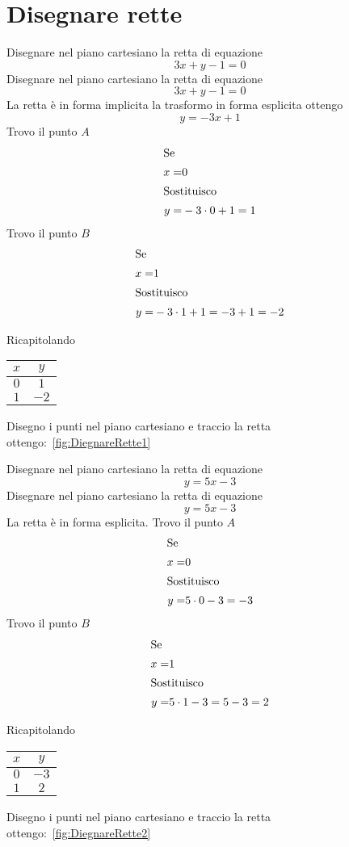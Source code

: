 \section{Disegnare rette}
\begin{exercise}
	Disegnare nel piano cartesiano la retta di equazione \[3x+y-1=0\]
	\tcblower
	Disegnare nel piano cartesiano la retta di equazione \[3x+y-1=0\]
	La retta è in forma implicita la trasformo in forma esplicita ottengo\[y=-3x+1\]
	Trovo il punto $A$ 
	\begin{align*}
		\intertext{Se}
		x=&0\\
		\intertext{Sostituisco}
		y=&-3\cdot 0+1=1
	\end{align*}
	Trovo il punto $B$ 
	\begin{align*}
		\intertext{Se}
		x=&1\\
		\intertext{Sostituisco}
		y=&-3\cdot 1+1=-3+1=-2
	\end{align*}
	
	Ricapitolando
\begin{center}
		\begin{tabular}{c|c}
		$x$&$y$  \\
		\hline
		$0$&$1$  \\
		$1$&$-2$ 
	\end{tabular}
\end{center}
	Disegno i punti nel  piano cartesiano e traccio la retta ottengo:~\vref{fig:DiegnareRette1}
	\begin{center}
		
		\label{fig:DiegnareRette1}
	\end{center}
\end{exercise}
\begin{exercise}
	Disegnare nel piano cartesiano la retta di equazione \[y=5x-3\]
	\tcblower
Disegnare nel piano cartesiano la retta di equazione \[y=5x-3\]
	La retta è in forma esplicita.
	Trovo il punto $A$ 
	\begin{align*}
		\intertext{Se}
		x=&0\\
		\intertext{Sostituisco}
		y=&5\cdot 0-3=-3
	\end{align*}
	Trovo il punto $B$ 
	\begin{align*}
		\intertext{Se}
		x=&1\\
		\intertext{Sostituisco}
		y=&5\cdot 1-3=5-3=2
	\end{align*}
	
	Ricapitolando
	\begin{center}
		\begin{tabular}{c|c}
			$x$&$y$  \\
			\hline
			$0$&$-3$  \\
			$1$&$2$ 
		\end{tabular}
	\end{center}
	Disegno i punti nel  piano cartesiano e traccio la retta ottengo:~\vref{fig:DiegnareRette2}
	\begin{center}
		
		\label{fig:DiegnareRette2}
	\end{center}
\end{exercise}
